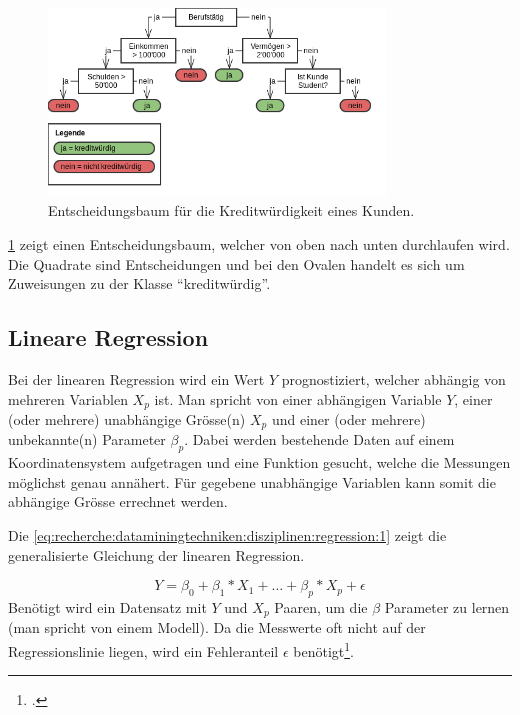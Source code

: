 \begin{figure}[H]
	\centering
	\includegraphics[width=0.8\textwidth]{images/decision_tree.png}
	\caption{Entscheidungsbaum für die Kreditwürdigkeit eines Kunden.}
	\label{fig:recherche:dataminingtechniken:disziplinen:classification}
\end{figure}

\cref{fig:recherche:dataminingtechniken:disziplinen:classification} zeigt einen Entscheidungsbaum, welcher von oben nach unten durchlaufen wird. Die Quadrate sind Entscheidungen und bei den Ovalen handelt es sich um Zuweisungen zu der Klasse "`kreditwürdig"'.


\subsection{Lineare Regression}
\label{sec:recherche:dataminingtechniken:disziplinen:regression}
Bei der linearen Regression wird ein Wert $Y$ prognostiziert, welcher abhängig von mehreren Variablen $X_p$ ist. Man spricht von einer abhängigen Variable $Y$, einer (oder mehrere) unabhängige Grösse(n) $X_p$ und einer (oder mehrere) unbekannte(n) Parameter $\beta_p$. Dabei werden bestehende Daten auf einem Koordinatensystem aufgetragen und eine Funktion gesucht, welche die Messungen möglichst genau annähert. Für gegebene unabhängige Variablen kann somit die abhängige Grösse errechnet werden.

Die \cref{eq:recherche:dataminingtechniken:disziplinen:regression:1} zeigt die generalisierte Gleichung der linearen Regression.

\begin{equation} \label{eq:recherche:dataminingtechniken:disziplinen:regression:1}
Y = \beta_0 + \beta_1 * X_1 + \dots + \beta_p * X_p + \epsilon
\end{equation}
Benötigt wird ein Datensatz mit $Y$ und $X_p$ Paaren, um die $\beta$ Parameter zu lernen (man spricht von einem Modell). Da die Messwerte oft nicht auf der Regressionslinie liegen, wird ein Fehleranteil $\epsilon$ benötigt\footcite{Einfache_lineare_Regression_2017-03-14}.


